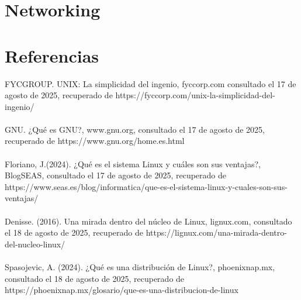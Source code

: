 \documentclass[10pt,a4paper,titlepage]{article}
\begin{document}
	\section*{Networking}
	
	\section*{Referencias}
	FYCGROUP. UNIX: La simplicidad del ingenio, fyccorp.com consultado el 17 de agosto de 2025, recuperado de https://fyccorp.com/unix-la-simplicidad-del-ingenio/	
	\\
	\\
	GNU. ¿Qué es GNU?, www.gnu.org, consultado el 17 de agosto de 2025, recuperado de https://www.gnu.org/home.es.html
	\\
	\\
	Floriano, J.(2024). ¿Qué es el sistema Linux y cuáles son sus ventajas?, BlogSEAS, consultado el 17 de agosto de 2025, recuperado de https://www.seas.es/blog/informatica/que-es-el-sistema-linux-y-cuales-son-sus-ventajas/
	\\
	\\
	Denisse. (2016). Una mirada dentro del núcleo de Linux, lignux.com, consultado el 18 de agosto de 2025, recuperado de https://lignux.com/una-mirada-dentro-del-nucleo-linux/
	\\
	\\
	Spasojevic, A. (2024). ¿Qué es una distribución de Linux?, phoenixnap.mx, consultado el 18 de agosto de 2025, recuperado de https://phoenixnap.mx/glosario/que-es-una-distribucion-de-linux
	
\end{document}
